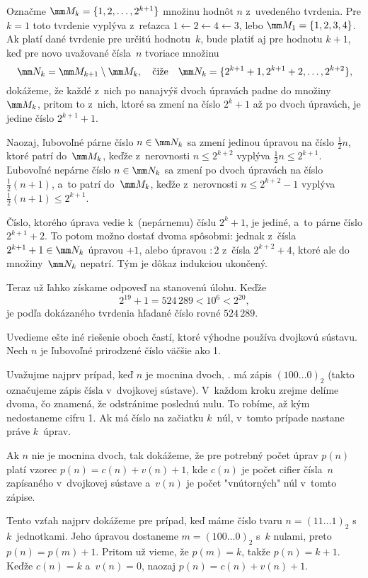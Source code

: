 {Označme $\mm M_k=\{1,2,\dots,2^{k+1}\}$ množinu hodnôt $n$ z~uvedeného
tvrdenia. Pre $k=1$ toto tvrdenie vyplýva z~reťazca $1\gets2\gets4\gets3$,
lebo $\mm M_1=\{1,2,3,4\}$. Ak platí dané tvrdenie
pre určitú hodnotu~$k$, bude platiť aj pre hodnotu $k+1$, keď
pre novo uvažované čísla~$n$ tvoriace množinu
$$
\mm N_k=\mm M_{k+1}\setminus \mm M_k,\quad\text{čiže}\quad
\mm N_k=\{2^{k+1}+1,2^{k+1}+2,\dots,2^{k+2}\},
$$
dokážeme, že každé z~nich po nanajvýš dvoch úpravách padne do
množiny~$\mm M_k$, pritom to z~nich, ktoré sa zmení
na číslo $2^k+1$ až po dvoch úpravách, je jedine číslo $2^{k+1}+1$.

Naozaj, ľubovoľné párne číslo $n\in\mm N_k$ sa zmení jedinou úpravou na číslo
$\frac12n$, ktoré patrí do~$\mm M_k$, keďže z~nerovnosti $n\le 2^{k+2}$ vyplýva
$\frac12 n\le 2^{k+1}$.
Ľubovoľné nepárne číslo $n\in\mm N_k$ sa zmení po dvoch úpravách na číslo $\frac12(n+1)$,
a~to patrí do~$\mm M_k$, keďže z~nerovnosti $n\le 2^{k+2}-1$ vyplýva
$\frac12 (n+1)\le 2^{k+1}$.

Číslo, ktorého úprava vedie k~(nepárnemu) číslu $2^k+1$, je jediné,
a~to párne číslo $2^{k+1}+2$. To potom možno dostať dvoma spôsobmi: jednak
z~čísla $2^{k+1}+1\in\mm N_k$ úpravou $\boxed{+1}$, alebo úpravou
$\boxed{:2}$ z~čísla $2^{k+2}+4$, ktoré ale do množiny~$\mm N_k$ nepatrí.
Tým je dôkaz indukciou ukončený.

Teraz už ľahko získame odpoveď na stanovenú úlohu. Keďže
$$
2^{19}+1=524\,289<10^6<2^{20},
$$
je podľa dokázaného tvrdenia hľadané číslo rovné $524\,289$.

\ineriesenie
Uvedieme ešte iné riešenie oboch častí, ktoré výhodne používa dvojkovú sústavu. Nech $n$ je ľubovoľné prirodzené číslo väčšie ako 1.

Uvažujme najprv prípad, keď $n$ je mocnina dvoch, \tj. má zápis $(100\ldots0)_2$ (takto označujeme zápis čísla v~dvojkovej sústave). V~každom kroku zrejme delíme dvoma, čo znamená, že odstránime poslednú nulu. To robíme, až kým nedostaneme cifru 1. Ak má číslo na začiatku $k$~núl, v~tomto prípade nastane práve $k$~úprav.

Ak $n$ nie je mocnina dvoch, tak dokážeme, že pre potrebný počet úprav $p(n)$ platí vzorec $p(n)=c(n)+v(n)+1$, kde $c(n)$ je počet cifier čísla~$n$ zapísaného v~dvojkovej sústave a~$v(n)$ je počet "vnútorných" núl v~tomto zápise.

Tento vzťah najprv dokážeme pre prípad, keď máme číslo tvaru $n=(11\ldots 1)_2$ s~$k$~jednotkami. Jeho úpravou dostaneme $m=(100\ldots 0)_2$ s~$k$ nulami, preto $p(n)=p(m)+1$. Pritom už vieme, že $p(m)=k$, takže $p(n)=k+1$. Keďže $c(n)=k$ a~$v(n)=0$, naozaj $p(n)=c(n)+v(n)+1$.

}
